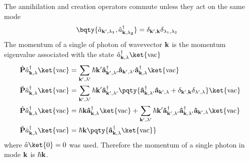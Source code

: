 \documentclass[12pt]{article}
\begin{document}
        The annihilation and creation operators commute unless they act on the same mode \begin{align*}
            \bqty{\hat{a}_{\bf k', \lambda_1}, \hat{a}^\dagger_{\bf k,\lambda_2}} &= \delta_{\bf k',\bf k} \delta_{\lambda_1,\lambda_2}
        \end{align*}
        The momentum of a single of photon of wavevector \(\bf k\) is the momentum eigenvalue associated with the state \(\hat{a}^\dagger_{\bf k,\lambda}\mathrm{\ket{vac} }\)  \begin{align*}
            \hat{\bf P} \hat{a}^\dagger_{\bf k,\lambda}\mathrm{\ket{vac} }  &= \sum_{\bf k', \lambda'} \hbar \bf k' \hat{a}^\dagger_{\bf k',\lambda'} \hat{a}_{\bf k',\lambda'} \hat{a}^\dagger_{\bf k,\lambda}\mathrm{\ket{vac} }\\
            \hat{\bf P} \hat{a}^\dagger_{\bf k,\lambda}\mathrm{\ket{vac} }  &= \sum_{\bf k', \lambda'} \hbar \bf k' \hat{a}^\dagger_{\bf k',\lambda'} \pqty{\hat{a}^\dagger_{\bf k,\lambda'} \hat{a}_{\bf k',\lambda} + \delta_{\bf k',\bf k} \delta_{\lambda', \lambda}}\mathrm{\ket{vac} }\\
            \hat{\bf P} \hat{a}^\dagger_{\bf k,\lambda}\mathrm{\ket{vac} }  &= \hbar \bf k \hat{a}^\dagger_{\bf k,\lambda} \mathrm{\ket{vac} } + \sum_{\bf k', \lambda'}\hbar \bf k' \hat{a}^\dagger_{\bf k',\lambda'} \hat{a}^\dagger_{\bf k,\lambda'} \hat{a}_{\bf k',\lambda} \mathrm{\ket{vac} } \\
            \hat{\bf P} \hat{a}^\dagger_{\bf k,\lambda}\mathrm{\ket{vac} }  &= \hbar \bf k\pqty{\hat{a}^\dagger_{\bf k,\lambda} \mathrm{\ket{vac} }}
        \end{align*}
        where \(\hat{a} \ket{0} = 0\) was used. Therefore the momentum of a single photon in mode \(\bf k\) is \(\hbar \bf k\).
\end{document}
